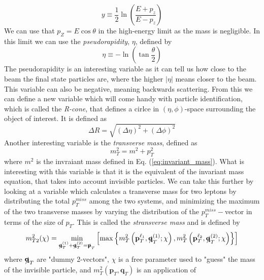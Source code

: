 \documentclass[12pt, a4paper]{book}
\begin{document}
\begin{equation}\label{eq:rapidity}
    y \equiv \frac{1}{2}\ln\left(\frac{E+p_z}{E-p_z}\right)  
\end{equation} 
We can use that $p_Z = E\cos\theta$ in the high-energy limit as the mass is negligible. In this limit we can use the \textit{pseudorapidity}, $\eta$, defined by
\begin{equation}\label{eq:pseudorapidity}
    \eta \equiv -\ln\left(\tan\frac{\theta}{2}\right)
\end{equation}
The pseudorapidity is an interesting variable as it can tell us how close to the beam the final state particles are, where the higher $\vert\eta\vert$ means closer to the beam. This variable can also be negative, meaning backwards scattering. 
From this we can define a new variable which will come handy with particle identification, which is called the \textit{R-cone}, that defines a cirlce in $(\eta,\phi)$-space surrounding the object of interest. It is defined as
\begin{equation}\label{eq:R-cone}
    \Delta R = \sqrt{(\Delta\eta)^2+(\Delta\phi)^2}
\end{equation}
Another interesting variable is the \textit{transverse mass}, defined as
\begin{equation}\label{eq:transverse_mass}
    m_T^2 = m^2 + p_T^2
\end{equation}
where $m^2$ is the invraiant mass defined in Eq. (\ref{eq:invariant_mass}). What is interesting with this variable is that it is the equivalent of the invariant mass equation, that takes into account invisible particles. 
We can take this further by looking at a variable which calculates a transverse mass for two leptons by distributing the total $p_T^{miss}$ among the two systems, 
and minimizing the maximum of the two transverse masses by varying the distribution of the $p_T^{miss}-$vector in terms of the size of $p_T$. This is called the \textit{stransverse mass} and is defined by
\begin{equation}\label{eq:stransverse_mass}
    m_{T2}^2(\chi) = \underset{\slashed{\mathbf{q}}^{(1)}_T + \slashed{\mathbf{q}}^{(2)}_T = \slashed{\mathbf{p}}_T}{\min}
    \left[\max \left\{m_T^2\left(\mathbf{p}_T^{\ell_1}, \slashed{\mathbf{q}}^{(1)}_T;\chi\right), m_T^2\left(\mathbf{p}_T^{\ell_2}, \slashed{\mathbf{q}}^{(2)}_T;\chi\right) 
    \right\}\right] 
\end{equation}
where $\slashed{\mathbf{q}}_T$ are "dummy 2-vectors", $\chi$ is a free parameter used to "guess" the mass of the invisible particle, and $m_T^2\left(\mathbf{p}_T, \mathbf{q}_T\right)$ is an application of 
\end{document}
